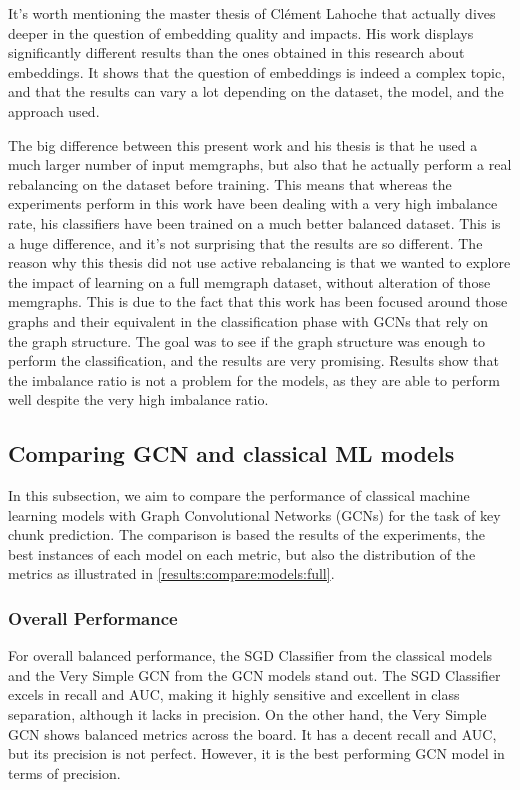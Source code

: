 It's worth mentioning the master thesis of Clément Lahoche that actually dives deeper in the question of embedding quality and impacts. His work displays significantly different results than the ones obtained in this research about embeddings. It shows that the question of embeddings is indeed a complex topic, and that the results can vary a lot depending on the dataset, the model, and the approach used.

The big difference between this present work and his thesis is that he used a much larger number of input memgraphs, but also that he actually perform a real rebalancing on the dataset before training. This means that whereas the experiments perform in this work have been dealing with a very high imbalance rate, his classifiers have been trained on a much better balanced dataset. This is a huge difference, and it's not surprising that the results are so different. The reason why this thesis did not use active rebalancing is that we wanted to explore the impact of learning on a full memgraph dataset, without alteration of those memgraphs. This is due to the fact that this work has been focused around those graphs and their equivalent in the classification phase with GCNs that rely on the graph structure. The goal was to see if the graph structure was enough to perform the classification, and the results are very promising. Results show that the imbalance ratio is not a problem for the models, as they are able to perform well despite the very high imbalance ratio.

\subsection{Comparing GCN and classical ML models}

In this subsection, we aim to compare the performance of classical machine learning models with Graph Convolutional Networks (GCNs) for the task of key chunk prediction. The comparison is based the results of the experiments, the best instances of each model on each metric, but also the distribution of the metrics as illustrated in \ref{results:compare:models:full}.

\subsubsection{Overall Performance}

For overall balanced performance, the SGD Classifier from the classical models and the Very Simple GCN from the GCN models stand out. The SGD Classifier excels in recall and AUC, making it highly sensitive and excellent in class separation, although it lacks in precision. On the other hand, the Very Simple GCN shows balanced metrics across the board. It has a decent recall and AUC, but its precision is not perfect. However, it is the best performing GCN model in terms of precision.

